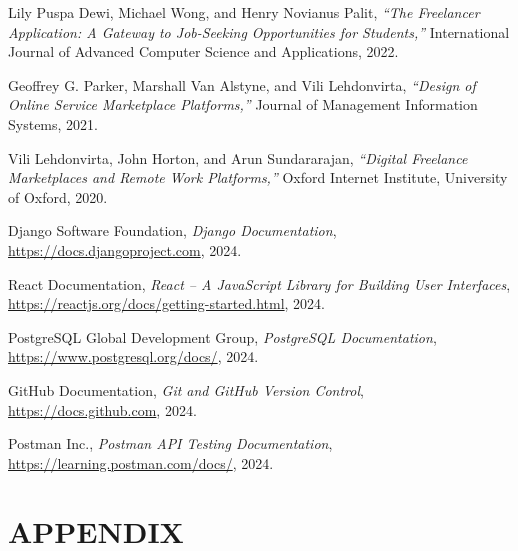 \documentclass[12pt,a4paper,oneside]{report}
\numberwithin{figure}{chapter}
\numberwithin{table}{chapter}
\begin{document}
\begin{enumerate}[leftmargin=2em, label={[\arabic*]}]

  \item Lily Puspa Dewi, Michael Wong, and Henry Novianus Palit,
        \textit{``The Freelancer Application: A Gateway to Job-Seeking Opportunities for
        Students,''} International Journal of Advanced Computer Science and Applications,
        2022.

  \item Geoffrey G. Parker, Marshall Van Alstyne, and Vili Lehdonvirta,
        \textit{``Design of Online Service Marketplace Platforms,''} Journal of
        Management Information Systems, 2021.

  \item Vili Lehdonvirta, John Horton, and Arun Sundararajan,
        \textit{``Digital Freelance Marketplaces and Remote Work Platforms,''} Oxford
        Internet Institute, University of Oxford, 2020.

  \item Django Software Foundation, \textit{Django Documentation},
        \url{https://docs.djangoproject.com}, 2024.

  \item React Documentation, \textit{React -- A JavaScript Library for Building User
        Interfaces}, \url{https://reactjs.org/docs/getting-started.html}, 2024.

  \item PostgreSQL Global Development Group, \textit{PostgreSQL Documentation},
        \url{https://www.postgresql.org/docs/}, 2024.

  \item GitHub Documentation, \textit{Git and GitHub Version Control},
        \url{https://docs.github.com}, 2024.

  \item Postman Inc., \textit{Postman API Testing Documentation},
        \url{https://learning.postman.com/docs/}, 2024.

\end{enumerate}

\appendix
\chapter{APPENDIX}
\end{document}
